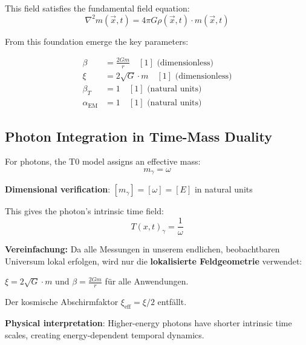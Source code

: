 \documentclass[12pt,a4paper]{article}
\newcommand{\Tfield}{T(x,t)}
\begin{document}
	This field satisfies the fundamental field equation:
	\begin{equation}
		\nabla^2 m(\vec{x},t) = 4\pi G \rho(\vec{x},t) \cdot m(\vec{x},t)
		\label{eq:field_equation}
	\end{equation}
	
	From this foundation emerge the key parameters:
	
	\begin{tcolorbox}[colback=blue!5!white,colframe=blue!75!black,title=T0 Model Parameters for Photon Analysis]
		\begin{align}
			\beta &= \frac{2Gm}{r} \quad [1] \text{ (dimensionless)} \\
			\xi &= 2\sqrt{G} \cdot m \quad [1] \text{ (dimensionless)} \\
			\beta_T &= 1 \quad [1] \text{ (natural units)} \\
			\alpha_{\text{EM}} &= 1 \quad [1] \text{ (natural units)}
		\end{align}
	\end{tcolorbox}
	
	\subsection{Photon Integration in Time-Mass Duality}
	
	For photons, the T0 model assigns an effective mass:
	\begin{equation}
		m_\gamma = \omega
		\label{eq:photon_effective_mass}
	\end{equation}
	
	\textbf{Dimensional verification}: $[m_\gamma] = [\omega] = [E]$ in natural units \checkmark
	
	This gives the photon's intrinsic time field:
	\begin{equation}
		\Tfield_\gamma = \frac{1}{\omega}
		\label{eq:photon_time_field}
	\end{equation}
\begin{tcolorbox}[colback=yellow!5!white,colframe=orange!75!black,title=Praktische Vereinfachung]
	\textbf{Vereinfachung:} Da alle Messungen in unserem endlichen, beobachtbaren Universum lokal erfolgen, wird nur die \textbf{lokalisierte Feldgeometrie} verwendet:
	
	$\xi = 2\sqrt{G} \cdot m$ und $\beta = \frac{2Gm}{r}$ für alle Anwendungen.
	
	Der kosmische Abschirmfaktor $\xi_{\text{eff}} = \xi/2$ entfällt.
\end{tcolorbox}	
	\textbf{Physical interpretation}: Higher-energy photons have shorter intrinsic time scales, creating energy-dependent temporal dynamics.
	
\end{document}
